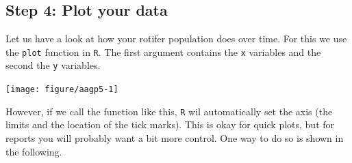 \documentclass[12pt,a4paper]{article}\usepackage[]{graphicx}\usepackage[]{color}
\newenvironment{knitrout}{}{} %
\begin{document}
\subsection{Step 4: Plot your data}
Let us have a look at how your rotifer population does over time. For this we use the \texttt{plot} function in \texttt{R}. The first argument contains the \texttt{x} variables and the second the \texttt{y} variables.
\begin{knitrout}
\color{fgcolor}

{\centering \texttt{[image: figure/aagp5-1]} 

}



\end{knitrout}
However, if we call the function like this, \texttt{R} wil automatically set the axis (the limits and the location of the tick marks). This is okay for quick plots, but for reports you will probably want a bit more control. One way to do so is shown in the following.
\end{document}
